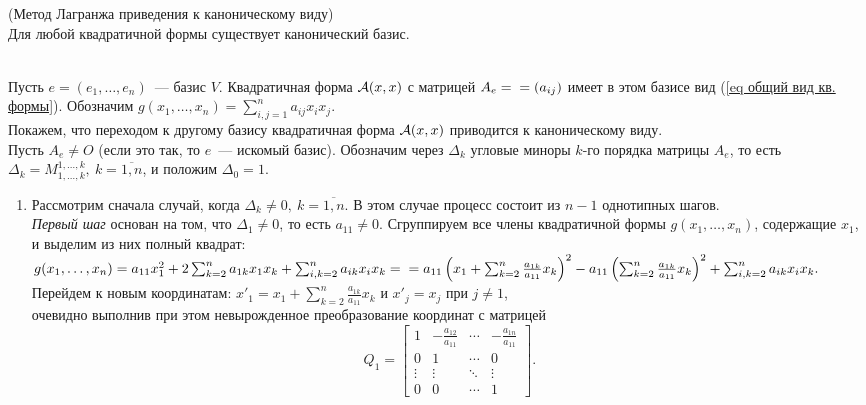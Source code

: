 \begin{theorem}
\label{th метод Лагранжа}
(Метод Лагранжа приведения к каноническому виду)\\
Для любой квадратичной формы существует канонический базис.
\end{theorem}
\begin{proofocre}
~\\
Пусть $e=(e_1,\ldots,e_n)$~--- базис $V$. Квадратичная форма ${\mathcal{A}}(x,x)$ с матрицей $A_e=\\=(a_{ij})$ имеет в этом базисе вид (\eqref{eq общий вид кв. формы}). Обозначим $g(x_1,\ldots,x_n)=\sum_{i,j=1}^na_{ij}x_ix_j$.\\
Покажем, что переходом к другому базису квадратичная форма ${\mathcal{A}}(x,x)$ приводится к каноническому виду.\\
Пусть $A_e\neq O$ (если это так, то $e$~--- искомый базис). Обозначим через $\Delta_k$ угловые миноры $k$-го порядка матрицы $A_e$, то есть $\Delta_k=M_{1,\ldots,k}^{1,\ldots,k},~k=\overline{1,n}$, и положим $\Delta_0=1$.
\begin{enumerate}
    \item Рассмотрим сначала случай, когда $\Delta_k\neq 0,~k=\overline{1,n}$. В этом случае процесс состоит из $n-1$ однотипных шагов.\\
    \emph{Первый шаг} основан на том, что $\Delta_1\neq 0$, то есть $a_{11}\neq 0$. Сгруппируем все члены квадратичной формы $g(x_1,\ldots,x_n)$, содержащие $x_1$, и выделим из них полный квадрат:\\
    $g(x_1,\ldots,x_n)=a_{11}x_1^2+2\sum_{k=2}^na_{1k}x_1x_k+\sum_{i,k=2}^na_{ik}x_ix_k=\\=a_{11}\left(x_1+\sum_{k=2}^n\frac{a_{1k}}{a_{11}}x_k \right)^2-a_{11}\left(\sum_{k=2}^n\frac{a_{1k}}{a_{11}}x_k\right)^2+\sum_{i,k=2}^na_{ik}x_ix_k.$\\
    Перейдем к новым координатам:
    $x'_1=x_1+\sum_{k=2}^n\frac{a_{1k}}{a_{11}}x_k$ и $x'_j=x_j$ при $j\neq 1$,\\
    очевидно выполнив при этом невырожденное преобразование координат с матрицей
    \begin{equation}
        Q_1=
        \begin{bmatrix}
            1 & -\frac{a_{12}}{a_{11}} & \cdots & -\frac{a_{1n}}{a_{11}}\\
            0 & 1 & \cdots & 0\\
            \vdots & \vdots & \ddots & \vdots\\
            0 & 0 & \cdots & 1
        \end{bmatrix}.

\end{equation}
\end{enumerate}
\end{proofocre}

